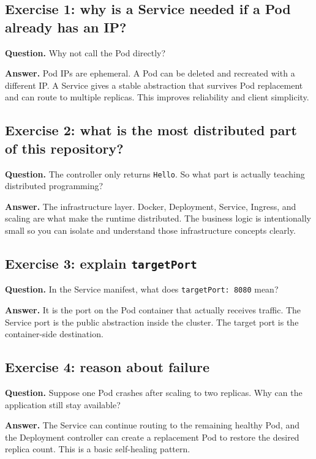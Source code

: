 \documentclass[a4paper,11pt]{article}
\begin{document}
\subsection*{Exercise 1: why is a Service needed if a Pod already has an IP?}

\textbf{Question.} Why not call the Pod directly?

\textbf{Answer.} Pod IPs are ephemeral. A Pod can be deleted and recreated with a different IP. A Service gives a stable abstraction that survives Pod replacement and can route to multiple replicas. This improves reliability and client simplicity.

\subsection*{Exercise 2: what is the most distributed part of this repository?}

\textbf{Question.} The controller only returns \texttt{Hello}. So what part is actually teaching distributed programming?

\textbf{Answer.} The infrastructure layer. Docker, Deployment, Service, Ingress, and scaling are what make the runtime distributed. The business logic is intentionally small so you can isolate and understand those infrastructure concepts clearly.

\subsection*{Exercise 3: explain \texttt{targetPort}}

\textbf{Question.} In the Service manifest, what does \texttt{targetPort: 8080} mean?

\textbf{Answer.} It is the port on the Pod container that actually receives traffic. The Service port is the public abstraction inside the cluster. The target port is the container-side destination.

\subsection*{Exercise 4: reason about failure}

\textbf{Question.} Suppose one Pod crashes after scaling to two replicas. Why can the application still stay available?

\textbf{Answer.} The Service can continue routing to the remaining healthy Pod, and the Deployment controller can create a replacement Pod to restore the desired replica count. This is a basic self-healing pattern.
\end{document}
